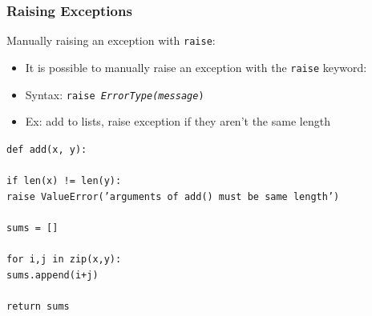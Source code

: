 \documentclass{beamer}
\newcommand{\code}[1]{\texttt{#1}}
\newcommand{\tab}{\hspace*{22pt}}
\begin{document}
\begin{frame}	
\end{frame}

\begin{frame}	
	\frametitle{Raising Exceptions}
	
	\begin{block}{Manually raising an exception with \code{raise}:}
		\begin{itemize}
			\item It is possible to manually raise an exception with the \code{raise} keyword:
			\item Syntax: \code{raise \emph{ErrorType(}\emph{message})}
			\item Ex: add to lists, raise exception if they aren't the same length
		\end{itemize}
		
		\vspace{10pt}
		
		\begin{footnotesize}
		\code{def add(x, y): \\[-2pt]
				\tab \\[-2pt]
				\tab if len(x) != len(y): \\[-2pt]
					\tab \tab raise ValueError('arguments of add() must be same length') \\[-2pt]
				\tab \\[-2pt]
				\tab sums = [] \\[-2pt]
				\tab \\[-2pt]
				\tab for i,j in zip(x,y): \\[-2pt]
				\tab \tab sums.append(i+j) \\[-2pt]
				\tab \\[-2pt]
			    \tab return sums
		}
		\end{footnotesize}
	\end{block}
	
\end{frame}
\end{document}
